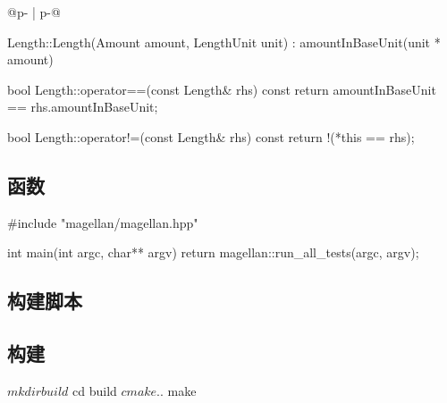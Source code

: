 \begin{content}
\begin{tabular}{@{}p{} 
                 | p{}@{}}
\begin{c++}[caption={test/quantity/Length.cpp}]
Length::Length(Amount amount, LengthUnit unit)
  : amountInBaseUnit(unit * amount)
{
}

bool Length::operator==(const Length& rhs) const
{
    return amountInBaseUnit == rhs.amountInBaseUnit;
}

bool Length::operator!=(const Length& rhs) const
{
    return !(*this == rhs);
}
\end{c++}
\end{tabular}

\subsection{函数}

\begin{leftbar}
\begin{c++}[caption={test/main.cpp}]
#include "magellan/magellan.hpp"

int main(int argc, char** argv)
{
    return magellan::run_all_tests(argc, argv);
}
\end{c++}
\end{leftbar}

\subsection{构建脚本}

\begin{leftbar}
\end{leftbar}

\subsection{构建}

\begin{leftbar}
\begin{ruby}[caption={构建Quantity，并执行测试}]
$ mkdir build
$ cd build
$ cmake ..
$ make
\end{ruby}
\end{leftbar}


\end{content}
